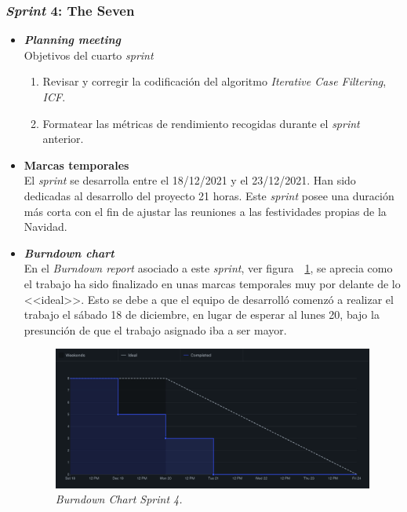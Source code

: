 \subsubsection{\textit{Sprint} 4: The Seven}
\begin{itemize}
\item \textbf{\textit{Planning meeting}}\\
Objetivos del cuarto \textit{sprint}
\begin{enumerate}
\item Revisar y corregir la codificación del algoritmo \textit{Iterative Case Filtering}, \textit{ICF}.
\item Formatear las métricas de rendimiento recogidas durante el \textit{sprint} anterior.
\end{enumerate}

\item \textbf{Marcas temporales}\\
El \textit{sprint} se desarrolla entre el 18/12/2021 y el 23/12/2021. Han sido dedicadas al desarrollo del proyecto 21 horas. Este \textit{sprint} posee una duración más corta con el fin de ajustar las reuniones a las festividades propias de la Navidad.

\item \textbf{\textit{Burndown chart}}\\
En el \textit{Burndown report} asociado a este \textit{sprint}, ver figura~~\ref{fig:BD-Sprint4}, se aprecia como el trabajo ha sido finalizado  en unas marcas temporales muy por delante de lo <<ideal>>. Esto se debe a que el equipo de desarrolló comenzó a realizar el trabajo el sábado 18 de diciembre, en lugar de esperar al lunes 20, bajo la presunción de que el trabajo asignado iba a ser mayor.
\begin{figure}
\begin{center}
\includegraphics[width=\textwidth]{../img/anexos/sprints/BD-Sprint4}
\caption{\textit{Burndown Chart Sprint 4.}}\label{fig:BD-Sprint4}
\end{center}
\end{figure}


\end{itemize}
